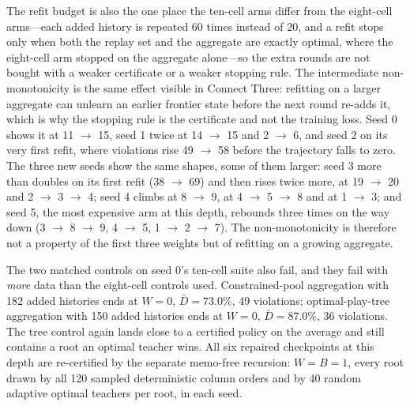 \documentclass[conference]{IEEEtran}
\begin{document}
The refit budget is also the one place the ten-cell arms differ from the eight-cell arms---each added history is repeated 60 times instead of 20, and a refit stops only when both the replay set and the aggregate are exactly optimal, where the eight-cell arm stopped on the aggregate alone---so the extra rounds are not bought with a weaker certificate or a weaker stopping rule. The intermediate non-monotonicity is the same effect visible in Connect Three: refitting on a larger aggregate can unlearn an earlier frontier state before the next round re-adds it, which is why the stopping rule is the certificate and not the training loss. Seed 0 shows it at 11 $\to$ 15, seed 1 twice at 14 $\to$ 15 and 2 $\to$ 6, and seed 2 on its very first refit, where violations rise 49 $\to$ 58 before the trajectory falls to zero. The three new seeds show the same shapes, some of them larger: seed 3 more than doubles on its first refit (38 $\to$ 69) and then rises twice more, at 19 $\to$ 20 and 2 $\to$ 3 $\to$ 4; seed 4 climbs at 8 $\to$ 9, at 4 $\to$ 5 $\to$ 8 and at 1 $\to$ 3; and seed 5, the most expensive arm at this depth, rebounds three times on the way down (3 $\to$ 8 $\to$ 9, 4 $\to$ 5, 1 $\to$ 2 $\to$ 7). The non-monotonicity is therefore not a property of the first three weights but of refitting on a growing aggregate.

The two matched controls on seed 0's ten-cell suite also fail, and they fail with \emph{more} data than the eight-cell controls used. Constrained-pool aggregation with 182 added histories ends at $W=0$, $\bar D=73.0\%$, 49 violations; optimal-play-tree aggregation with 150 added histories ends at $W=0$, $\bar D=87.0\%$, 36 violations. The tree control again lands close to a certified policy on the average and still contains a root an optimal teacher wins. All six repaired checkpoints at this depth are re-certified by the separate memo-free recursion: $W=B=1$, every root drawn by all 120 sampled deterministic column orders and by 40 random adaptive optimal teachers per root, in each seed.
\end{document}
